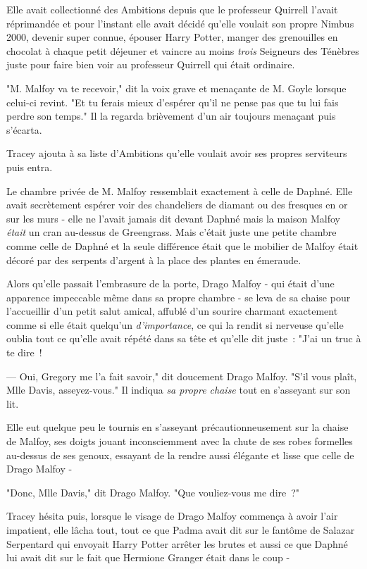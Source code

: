 Elle avait collectionné des Ambitions depuis que le professeur Quirrell l'avait réprimandée et pour l'instant elle avait décidé qu'elle voulait son propre Nimbus 2000, devenir super connue, épouser Harry Potter, manger des grenouilles en chocolat à chaque petit déjeuner et vaincre au moins \emph{trois} Seigneurs des Ténèbres juste pour faire bien voir au professeur Quirrell qui était ordinaire.

"M. Malfoy va te recevoir," dit la voix grave et menaçante de M. Goyle lorsque celui-ci revint. "Et tu ferais mieux d'espérer qu'il ne pense pas que tu lui fais perdre son temps." Il la regarda brièvement d'un air toujours menaçant puis s'écarta.

Tracey ajouta à sa liste d'Ambitions qu'elle voulait avoir ses propres serviteurs puis entra.

Le chambre privée de M. Malfoy ressemblait exactement à celle de Daphné. Elle avait secrètement espérer voir des chandeliers de diamant ou des fresques en or sur les murs - elle ne l'avait jamais dit devant Daphné mais la maison Malfoy \emph{était} un cran au-dessus de Greengrass. Mais c'était juste une petite chambre comme celle de Daphné et la seule différence était que le mobilier de Malfoy était décoré par des serpents d'argent à la place des plantes en émeraude.

Alors qu'elle passait l'embrasure de la porte, Drago Malfoy - qui était d'une apparence impeccable même dans sa propre chambre - se leva de sa chaise pour l'accueillir d'un petit salut amical, affublé d'un sourire charmant exactement comme si elle était quelqu'un \emph{d'importance}, ce qui la rendit si nerveuse qu'elle oublia tout ce qu'elle avait répété dans sa tête et qu'elle dit juste~: "J'ai un truc à te dire~!

--- Oui, Gregory me l'a fait savoir," dit doucement Drago Malfoy. "S'il vous plaît, Mlle Davis, asseyez-vous." Il indiqua \emph{sa propre chaise} tout en s'asseyant sur son lit.

Elle eut quelque peu le tournis en s'asseyant précautionneusement sur la chaise de Malfoy, ses doigts jouant inconsciemment avec la chute de ses robes formelles au-dessus de ses genoux, essayant de la rendre aussi élégante et lisse que celle de Drago Malfoy -

"Donc, Mlle Davis," dit Drago Malfoy. "Que vouliez-vous me dire~?"

Tracey hésita puis, lorsque le visage de Drago Malfoy commença à avoir l'air impatient, elle lâcha tout, tout ce que Padma avait dit sur le fantôme de Salazar Serpentard qui envoyait Harry Potter arrêter les brutes et aussi ce que Daphné lui avait dit sur le fait que Hermione Granger était dans le coup -

